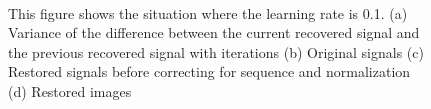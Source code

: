 \documentclass[UTF8,12pt]{article}
\begin{document}
	\begin{figure}[!ht]
		\centering
		\quad
		\\
		\quad
		\caption{\label{fig:sound1} This figure shows the situation where the learning rate is 0.1. (a) Variance of the difference between the current recovered signal and the previous recovered signal with iterations (b) Original signals (c) Restored signals before correcting for sequence and normalization (d) Restored images}
	\end{figure}
\end{document}
